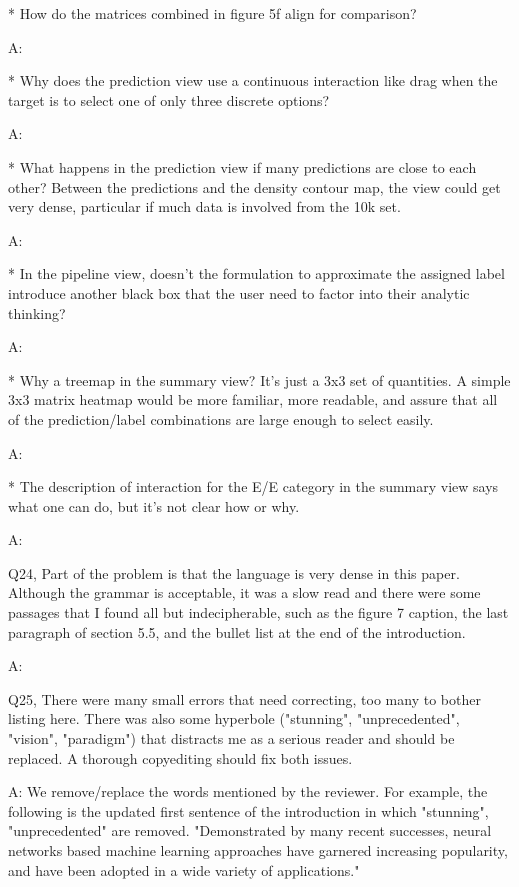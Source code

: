 * How do the matrices combined in figure 5f align for comparison?

A:

* Why does the prediction view use a continuous interaction like drag when the target is to select one of only three discrete options?

A:

* What happens in the prediction view if many predictions are close to each other? Between the predictions and the density contour map, the view could get very dense, particular if much data is involved from the 10k set.

A:

* In the pipeline view, doesn't the formulation to approximate the assigned label introduce another black box that the user need to factor into their analytic thinking?

A:

* Why a treemap in the summary view? It's just a 3x3 set of quantities. A simple 3x3 matrix heatmap would be more familiar, more readable, and assure that all of the prediction/label combinations are large enough to select easily.

A:

* The description of interaction for the E/E category in the summary view says what one can do, but it's not clear how or why.

A:

Q24, Part of the problem is that the language is very dense in this paper. Although the grammar is acceptable, it was a slow read and there were some passages that I found all but indecipherable, such as the figure 7 caption, the last paragraph of section 5.5, and the bullet list at the end of the introduction.

A:

Q25, There were many small errors that need correcting, too many to bother listing here. There was also some hyperbole ("stunning", "unprecedented", "vision", "paradigm") that distracts me as a serious reader and should be replaced. A thorough copyediting should fix both issues.

A: We remove/replace the words mentioned by the reviewer. For example, the following is the updated first sentence of the introduction in which "stunning", "unprecedented" are removed. "Demonstrated by many recent successes, neural networks based machine learning approaches have garnered increasing popularity, and have been adopted in a wide variety of applications."


